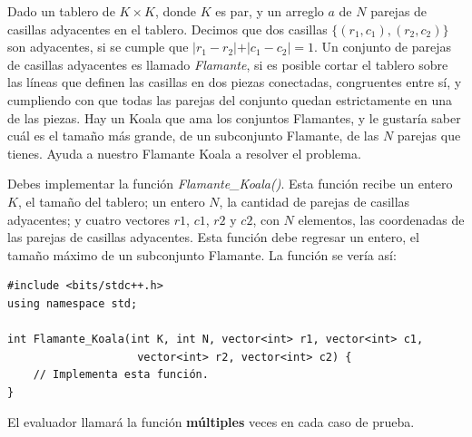 \documentclass[12pt]{scrartcl}
\begin{document}
    
    
    \vspace{10pt}

    

        Dado un tablero de $K \times K$, donde $K$ es par, y un arreglo $a$ de $N$ parejas de casillas adyacentes en el tablero. Decimos que dos casillas $\{(r_1, c_1), (r_2, c_2)\}$ son adyacentes, si se cumple que $\lvert r_1 - r_2 \lvert + \lvert c_1 - c_2 \lvert = 1$. Un conjunto de parejas de casillas adyacentes es llamado {\itshape Flamante}, si es posible cortar el tablero sobre las líneas que definen las casillas en dos piezas conectadas, congruentes entre sí, y cumpliendo con que todas las parejas del conjunto quedan estrictamente en una de las piezas. Hay un Koala que ama los conjuntos Flamantes, y le gustaría saber cuál es el tamaño más grande, de un subconjunto Flamante, de las $N$ parejas que tienes. Ayuda a nuestro Flamante Koala a resolver el problema.
        

       Debes implementar la función {\itshape Flamante\_Koala()}. Esta función recibe un entero $K$, el tamaño del tablero; un entero $N$, la cantidad de parejas de casillas adyacentes; y cuatro vectores $r1$, $c1$, $r2$ y $c2$,  con $N$ elementos, las coordenadas de las parejas de casillas adyacentes. Esta función debe regresar un entero, el tamaño máximo de un subconjunto Flamante. 
        La función se vería así:

\begin{verbatim}
#include <bits/stdc++.h>
using namespace std;

int Flamante_Koala(int K, int N, vector<int> r1, vector<int> c1,
                    vector<int> r2, vector<int> c2) {
    // Implementa esta función.
}
\end{verbatim}

    El evaluador llamará la función \textbf{múltiples} veces en cada caso de prueba.

    
\end{document}
